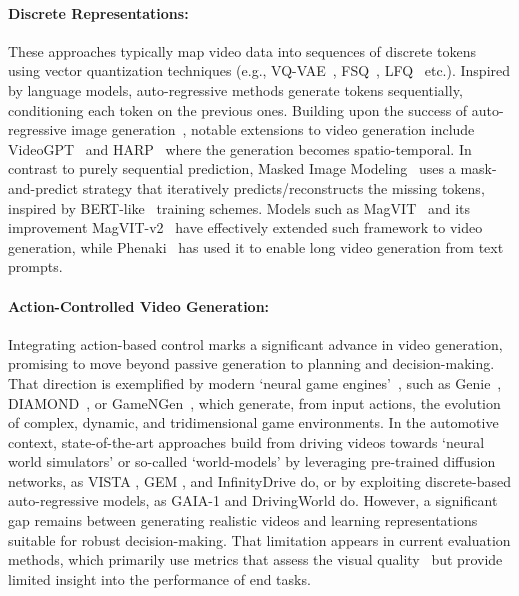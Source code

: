 \paragraph{Discrete Representations:} These approaches typically map video data into sequences of discrete tokens using vector quantization techniques (e.g., VQ-VAE~\cite{van2017vqvae}, FSQ~\cite{menter2024fsq}, LFQ~\cite{yu2024magvit2} etc.). Inspired by language models, auto-regressive methods generate tokens sequentially, conditioning each token on the previous ones. Building upon the success of auto-regressive image generation~\cite{chen2020igpt,ramesh2021dalle,esser2020taming}, notable extensions to video generation include VideoGPT~\cite{yan2021videogpt} and HARP~\cite{Seo2022HARP} where the generation becomes spatio-temporal. 
In contrast to purely sequential prediction, Masked Image Modeling~\cite{chang2022maskgit} uses a mask-and-predict strategy that iteratively predicts/reconstructs the missing tokens, inspired by BERT-like~\cite{devlin2019BERT} training schemes. 
Models such as MagVIT~\cite{yu2023magvit} and its improvement MagVIT-v2~\cite{yu2024magvit2} have effectively extended such framework to video generation, while Phenaki~\cite{villegas2023phenaki} has used it to enable long video generation from text prompts.


\paragraph{Action-Controlled Video Generation:} 

Integrating action-based control marks a significant advance in video generation, promising to move beyond passive generation to planning and decision-making.
%
That direction is exemplified by modern `neural game engines'~\cite{Bamford2020neuralgameengine}, such as Genie~\cite{bruce2024genie}, DIAMOND~\cite{alonso2024DIAMOND}, or GameNGen~\cite{valevski2024GameNGen}, which generate, from input actions, the evolution of complex, dynamic, and tridimensional game environments. 
%
In the automotive context, state-of-the-art approaches build from driving videos towards `neural world simulators' or so-called `world-models' by leveraging pre-trained diffusion networks, as VISTA \citep{gao2024vista}, GEM \citep{hassan2024gem}, and  InfinityDrive \citep{guo2024infinitydrive} do, or by exploiting discrete-based auto-regressive models, as GAIA-1 \cite{hu2023gaia1} and DrivingWorld \citep{hu2024drivingworld} do. 
%
However, a significant gap remains between generating realistic videos and learning representations suitable for robust decision-making. That limitation appears in current evaluation methods, which primarily use metrics that assess the visual quality~\citep{Unterthiner2019FVD,zhang2018lips} but provide limited insight into the performance of end tasks.







